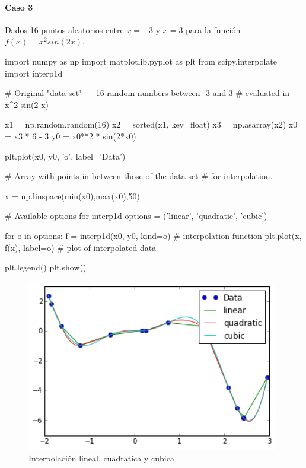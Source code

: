 \documentclass[12pt,spanish]{article}
\begin{document}
\newpage

\paragraph{Caso 3}

Dados 16 puntos aleatorios entre $x=-3$ y $x=3$ para la función $f(x) = x^2 sin(2 x)$.

\begin{center}
\begin{boxedverbatim}

import numpy as np
import matplotlib.pyplot as plt
from scipy.interpolate import interp1d

# Original "data set" --- 16 random numbers between -3 and 3
# evaluated in x^2 sin(2 x)

x1 = np.random.random(16)
x2 = sorted(x1, key=float)
x3 = np.asarray(x2)
x0 = x3 * 6 - 3
y0 = x0**2 * sin(2*x0)

plt.plot(x0, y0, 'o', label='Data')

# Array with points in between those of the data set
# for interpolation.

x = np.linspace(min(x0),max(x0),50)

# Available options for interp1d
options = ('linear', 'quadratic', 'cubic')

for o in options:
    f = interp1d(x0, y0, kind=o)  # interpolation function
    plt.plot(x, f(x), label=o)    # plot of interpolated data

plt.legend()
plt.show()
\end{boxedverbatim}
\end{center}

\begin{figure}[H]
    \centering
	\includegraphics[height=7.5cm]{caso3.png}
    \caption{Interpolación lineal, cuadratica y cubica}
\end{figure}
\end{document}
